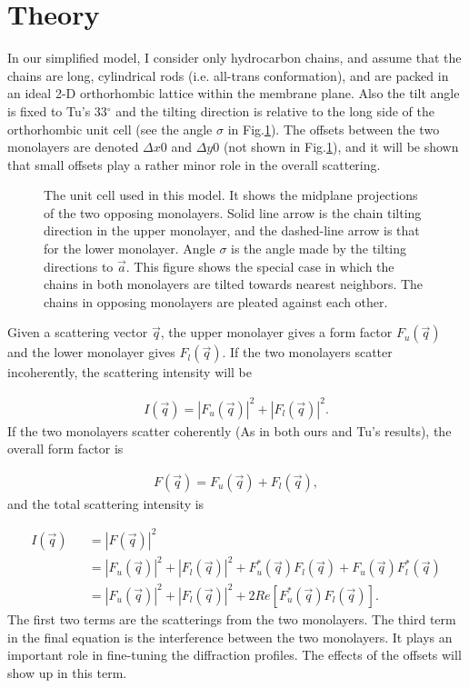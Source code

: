 \section{Theory}

In our simplified model, I consider only hydrocarbon chains, and assume 
that the chains are long, cylindrical rods (i.e. all-trans conformation), 
and are packed in an ideal 2-D orthorhombic lattice within the membrane
plane. Also the tilt angle is fixed to Tu's 33$^{\circ}$ and the tilting 
direction is relative to the long side of the orthorhombic unit cell (see
the angle $\sigma$ in Fig.\ref{chain}). The offsets between
the two monolayers are denoted $\Delta x0$ and $\Delta y0$ (not shown
in Fig.\ref{chain}), and it will be shown that small offsets play a rather 
minor role in the overall scattering.

\begin{figure}
\centerline {}
\caption{The unit cell used in this model. It shows the midplane projections
of the two opposing monolayers. Solid line arrow is the chain
tilting direction in the upper monolayer, and the dashed-line arrow is
that for the lower monolayer. Angle $\sigma$ is the angle made by the
tilting directions to $\vec{a}$. This figure shows the special case in which
the chains in both monolayers are tilted towards nearest neighbors. The chains
in opposing monolayers are pleated against each other.
\label{chain}}
\end{figure}

Given a scattering vector $\vec{q}$, the upper monolayer
gives a form factor $F_{u}(\vec{q})$ and the lower monolayer gives
$F_{l}(\vec{q})$. If the two monolayers scatter incoherently, the scattering
intensity will be

\begin{eqnarray}
\label{inco}
I(\vec{q}) = |F_{u}(\vec{q})|^2 + |F_{l}(\vec{q})|^2.
\end{eqnarray}
If the two monolayers scatter coherently (As in both ours and Tu's
results), the overall form factor is

\begin{eqnarray}
\label{form}
F(\vec{q}) = F_{u}(\vec{q}) + F_{l}(\vec{q}),
\end{eqnarray}
and the total scattering intensity is

\begin{eqnarray}
\label{inten}
I(\vec{q}) && = |F(\vec{q})|^2 \nonumber \\
&& = |F_{u}(\vec{q})|^2 + |F_{l}(\vec{q})|^2 + F^{*}_{u}(\vec{q}) F_{l}(\vec{q}) + F_{u}(\vec{q}) F^{*}_{l}(\vec{q}) \nonumber \\
&& = |F_{u}(\vec{q})|^2 + |F_{l}(\vec{q})|^2 + 2 Re[F^{*}_{u}(\vec{q}) F_{l}(\vec{q})].
\end{eqnarray}
The first two terms are the scatterings from the two monolayers.
The third term in the final equation is the interference between the two 
monolayers. It plays an important role in fine-tuning the diffraction 
profiles. The effects of the offsets will show up in this term.


